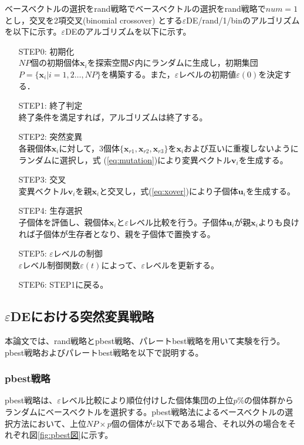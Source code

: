 \documentclass[a4paper,12pt]{jsreport}
\begin{document}
ベースベクトルの選択をrand戦略でベースベクトルの選択をrand戦略で$num=1$とし，交叉を2項交叉(binomial crossover) とする$\varepsilon$DE/rand/1/binのアルゴリズムを以下に示す。$\varepsilon$DEのアルゴリズムを以下に示す。
\begin{enumerate}
\item[STEP0:]\mbox{初期化}\\ 
$NP$個の初期個体$\bm{x}_i$を探索空間$\cal{S}$内にランダムに生成し，初期集団$P= \{ \bm{x}_i| i=1,2 \dots ,NP \}$を構築する。また，$\varepsilon$レベルの初期値${\varepsilon}(0)$を決定する．

\item[STEP1:]\mbox{終了判定}\\ 
終了条件を満足すれば，アルゴリズムは終了する。

\item[STEP2:]\mbox{突然変異}\\ 
各親個体$\bm{x}_i$に対して，3個体$ \{  \bm{x}_{r1},\bm{x}_{r2},\bm{x}_{r3}  \} $を$\bm{x}_i$および互いに重複しないようにランダムに選択し，式
(\ref{eq:mutation})により変異ベクトル$\bm{v}_i$を生成する。


\item[STEP3:]\mbox{交叉}\\ 
変異ベクトル$\bm{v}_i$を親$\bm{x}_i$と交叉し，式(\ref{eq:xover})により子個体$\bm{u}_{i}$を生成する。

\item[STEP4:]\mbox{生存選択}\\ 
子個体を評価し、親個体$\bm{x}_i$と$\varepsilon$レベル比較を行う。子個体$\bm{u}_i$が親$\bm{x}_i$よりも良ければ子個体が生存者となり、親を子個体で置換する。

\item[STEP5:]\mbox{$\varepsilon$レベルの制御}\\ 
$\varepsilon$レベル制御関数$\varepsilon(t)$によって、$\varepsilon$レベルを更新する。

\item[STEP6:]\mbox{STEP1に戻る。}\\ 

\end{enumerate}

\subsection{$\varepsilon$DEにおける突然変異戦略}
本論文では、rand戦略とpbest戦略、パレートbest戦略を用いて実験を行う。pbest戦略およびパレートbest戦略を以下で説明する。
\subsubsection{pbest戦略}
pbest戦略は、$\varepsilon$レベル比較により順位付けした個体集団の上位$p$\%の個体群からランダムにベースベクトルを選択する。pbest戦略法によるベースベクトルの選択方法において、上位$NP \times p$個の個体が$\varepsilon$以下である場合、それ以外の場合をそれぞれ図\ref{fig:pbest図}に示す。
\end{document}
